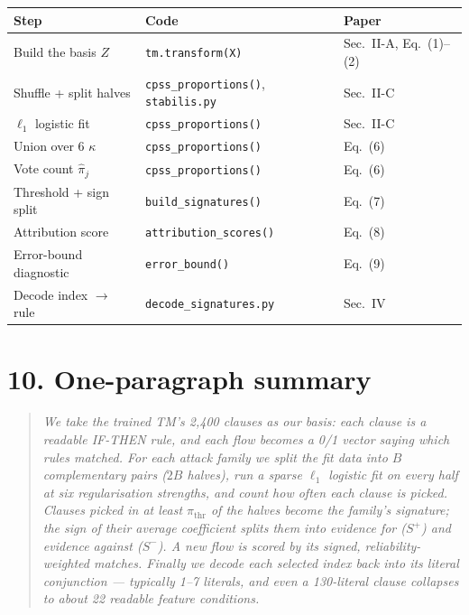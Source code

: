 \documentclass[11pt]{article}
\begin{document}
\begin{center}
\footnotesize
\begin{tabular}{@{}lll@{}}
\toprule
Step & Code & Paper \\
\midrule
Build the basis $Z$      & \texttt{tm.transform(X)} & Sec.~II-A, Eq.~(1)--(2) \\
Shuffle + split halves   & \texttt{cpss\_proportions()}, \texttt{stabilis.py} & Sec.~II-C \\
$\ell_1$ logistic fit    & \texttt{cpss\_proportions()} & Sec.~II-C \\
Union over 6 $\kappa$    & \texttt{cpss\_proportions()} & Eq.~(6) \\
Vote count $\hat\pi_j$   & \texttt{cpss\_proportions()} & Eq.~(6) \\
Threshold + sign split   & \texttt{build\_signatures()} & Eq.~(7) \\
Attribution score        & \texttt{attribution\_scores()} & Eq.~(8) \\
Error-bound diagnostic   & \texttt{error\_bound()} & Eq.~(9) \\
Decode index $\to$ rule  & \texttt{decode\_signatures.py} & Sec.~IV \\
\bottomrule
\end{tabular}
\end{center}

\section*{10. One-paragraph summary}

\begin{quote}
\emph{We take the trained TM's 2{,}400 clauses as our basis: each clause is a
readable IF-THEN rule, and each flow becomes a 0/1 vector saying which rules
matched. For each attack family we split the fit data into $B$ complementary
pairs ($2B$ halves), run a sparse $\ell_1$ logistic fit on every half at six
regularisation strengths, and count how often each clause is picked. Clauses
picked in at least $\pi_{\mathrm{thr}}$ of the halves become the family's
signature; the sign of their average coefficient splits them into evidence
for ($S^+$) and evidence against ($S^-$). A new flow is scored by its signed,
reliability-weighted matches. Finally we decode each selected index back into
its literal conjunction --- typically 1--7 literals, and even a 130-literal
clause collapses to about 22 readable feature conditions.}
\end{quote}
\end{document}
